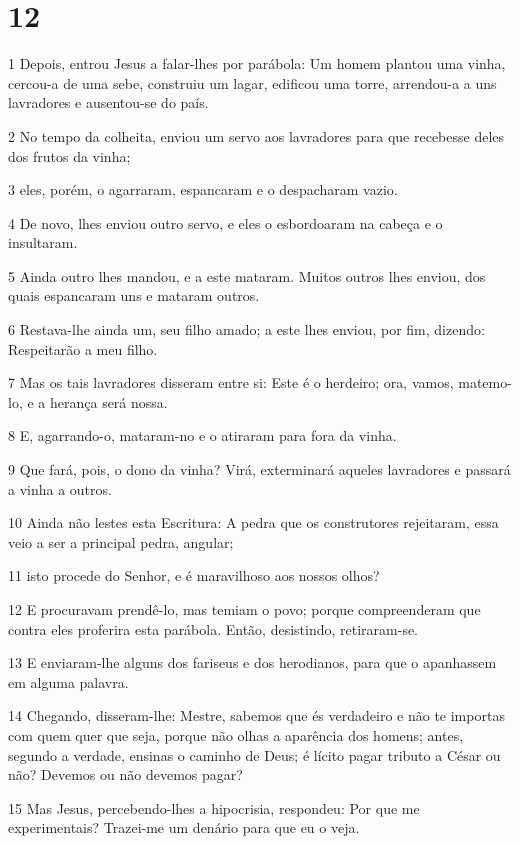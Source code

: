 \chapter{12}

\par 1 Depois, entrou Jesus a falar-lhes por parábola: Um homem plantou uma vinha, cercou-a de uma sebe, construiu um lagar, edificou uma torre, arrendou-a a uns lavradores e ausentou-se do país.
\par 2 No tempo da colheita, enviou um servo aos lavradores para que recebesse deles dos frutos da vinha;
\par 3 eles, porém, o agarraram, espancaram e o despacharam vazio.
\par 4 De novo, lhes enviou outro servo, e eles o esbordoaram na cabeça e o insultaram.
\par 5 Ainda outro lhes mandou, e a este mataram. Muitos outros lhes enviou, dos quais espancaram uns e mataram outros.
\par 6 Restava-lhe ainda um, seu filho amado; a este lhes enviou, por fim, dizendo: Respeitarão a meu filho.
\par 7 Mas os tais lavradores disseram entre si: Este é o herdeiro; ora, vamos, matemo-lo, e a herança será nossa.
\par 8 E, agarrando-o, mataram-no e o atiraram para fora da vinha.
\par 9 Que fará, pois, o dono da vinha? Virá, exterminará aqueles lavradores e passará a vinha a outros.
\par 10 Ainda não lestes esta Escritura: A pedra que os construtores rejeitaram, essa veio a ser a principal pedra, angular;
\par 11 isto procede do Senhor, e é maravilhoso aos nossos olhos?
\par 12 E procuravam prendê-lo, mas temiam o povo; porque compreenderam que contra eles proferira esta parábola. Então, desistindo, retiraram-se.
\par 13 E enviaram-lhe alguns dos fariseus e dos herodianos, para que o apanhassem em alguma palavra.
\par 14 Chegando, disseram-lhe: Mestre, sabemos que és verdadeiro e não te importas com quem quer que seja, porque não olhas a aparência dos homens; antes, segundo a verdade, ensinas o caminho de Deus; é lícito pagar tributo a César ou não? Devemos ou não devemos pagar?
\par 15 Mas Jesus, percebendo-lhes a hipocrisia, respondeu: Por que me experimentais? Trazei-me um denário para que eu o veja.
